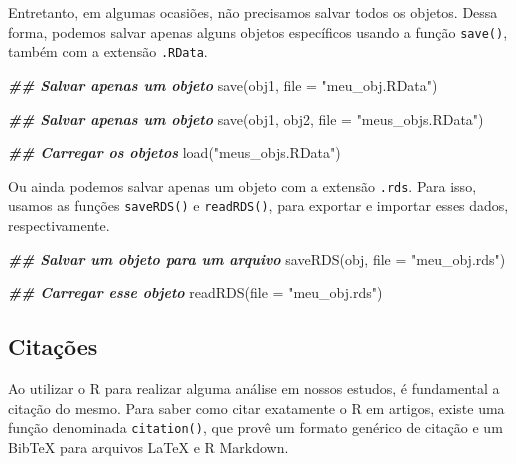 \documentclass[
]{book}
\newenvironment{Shaded}{\begin{snugshade}}{\end{snugshade}}
\newcommand{\AttributeTok}[1]{\textcolor[rgb]{0.61,0.61,0.61}{#1}}
\newcommand{\DocumentationTok}[1]{\textcolor[rgb]{0.37,0.37,0.37}{\textbf{\textit{#1}}}}
\newcommand{\FunctionTok}[1]{\textcolor[rgb]{0,0,0}{#1}}
\newcommand{\NormalTok}[1]{#1}
\newcommand{\StringTok}[1]{\textcolor[rgb]{0.5,0.5,0.5}{#1}}
\begin{document}
Entretanto, em algumas ocasiões, não precisamos salvar todos os objetos. Dessa forma, podemos salvar apenas alguns objetos específicos usando a função \texttt{save()}, também com a extensão \texttt{.RData}.

\begin{Shaded}
\begin{Highlighting}[]
\DocumentationTok{\#\# Salvar apenas um objeto}
\FunctionTok{save}\NormalTok{(obj1, }\AttributeTok{file =} \StringTok{"meu\_obj.RData"}\NormalTok{)}

\DocumentationTok{\#\# Salvar apenas um objeto}
\FunctionTok{save}\NormalTok{(obj1, obj2, }\AttributeTok{file =} \StringTok{"meus\_objs.RData"}\NormalTok{)}

\DocumentationTok{\#\# Carregar os objetos}
\FunctionTok{load}\NormalTok{(}\StringTok{"meus\_objs.RData"}\NormalTok{)}
\end{Highlighting}
\end{Shaded}

Ou ainda podemos salvar apenas um objeto com a extensão \texttt{.rds}. Para isso, usamos as funções \texttt{saveRDS()} e \texttt{readRDS()}, para exportar e importar esses dados, respectivamente.

\begin{Shaded}
\begin{Highlighting}[]
\DocumentationTok{\#\# Salvar um objeto para um arquivo}
\FunctionTok{saveRDS}\NormalTok{(obj, }\AttributeTok{file =} \StringTok{"meu\_obj.rds"}\NormalTok{)}

\DocumentationTok{\#\# Carregar esse objeto}
\FunctionTok{readRDS}\NormalTok{(}\AttributeTok{file =} \StringTok{"meu\_obj.rds"}\NormalTok{)}
\end{Highlighting}
\end{Shaded}

\hypertarget{citauxe7uxf5es}{%
\subsection{Citações}\label{citauxe7uxf5es}}

Ao utilizar o R para realizar alguma análise em nossos estudos, é fundamental a citação do mesmo. Para saber como citar exatamente o R em artigos, existe uma função denominada \texttt{citation()}, que provê um formato genérico de citação e um BibTeX para arquivos LaTeX e R Markdown.
\end{document}

